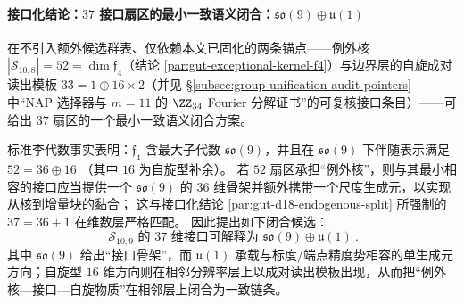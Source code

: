 \paragraph{接口化结论：\texorpdfstring{$37$}{37} 接口扇区的最小一致语义闭合：\texorpdfstring{$\mathfrak{so}(9)\oplus\mathfrak{u}(1)$}{so(9)+u(1)}}\label{par:gut-sector37-so9-u1}
在不引入额外候选群表、仅依赖本文已固化的两条锚点——例外核 \(|\mathcal{S}_{10,8}|=52=\dim\mathfrak{f}_4\)（结论 \ref{par:gut-exceptional-kernel-f4}）与边界层的自旋成对读出模板 \(33=1\oplus 16\times 2\)（并见 \S\ref{subsec:group-unification-audit-pointers} 中“NAP 选择器与 \(m=11\) 的 \(\ZZ_{34}\) Fourier 分解证书”的可复核接口条目）——可给出 \(37\) 扇区的一个最小一致语义闭合方案。
\par
标准李代数事实表明：\(\mathfrak{f}_4\) 含最大子代数 \(\mathfrak{so}(9)\)，并且在 \(\mathfrak{so}(9)\) 下伴随表示满足
\(
52=36\oplus 16
\)
（其中 \(16\) 为自旋型补余）。
若 \(52\) 扇区承担“例外核”，则与其最小相容的接口应当提供一个 \(\mathfrak{so}(9)\) 的 \(36\) 维骨架并额外携带一个尺度生成元，以实现从核到增量块的黏合；
这与接口化结论 \ref{par:gut-d18-endogenous-split} 所强制的
\(
37=36+1
\)
在维数层严格匹配。
因此提出如下闭合候选：
\[
\boxed{\ \mathcal{S}_{10,9}\text{ 的 \(37\) 维接口可解释为 }\mathfrak{so}(9)\oplus\mathfrak{u}(1)\ }.
\]
其中 \(\mathfrak{so}(9)\) 给出“接口骨架”，而 \(\mathfrak{u}(1)\) 承载与标度/端点精度势相容的单生成元方向；自旋型 \(16\) 维方向则在相邻分辨率层上以成对读出模板出现，从而把“例外核—接口—自旋物质”在相邻层上闭合为一致链条。

